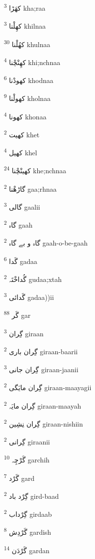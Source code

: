 \documentclass[12pt]{article}
\begin{document}
\begin{RTL}
\begin{multicols}{5}
{\ur کھَڑا}   \textsuperscript{3} kha;raa

{\ur کھِلْنا}   \textsuperscript{3} khilnaa

{\ur کھُلْنا}   \textsuperscript{30} khulnaa

{\ur کھِنْچْنا}   \textsuperscript{4} khi;nchnaa

{\ur کھودْنا}   \textsuperscript{6} khodnaa

{\ur کھولْنا}   \textsuperscript{9} kholnaa

{\ur کھونا}   \textsuperscript{4} khonaa

{\ur کھیت}   \textsuperscript{2} khet

{\ur کھیل}   \textsuperscript{4} khel

{\ur کھینْچْنا}   \textsuperscript{24} khe;nchnaa

{\ur گاڑھْنا}   \textsuperscript{2} gaa;rhnaa

{\ur گالی}   \textsuperscript{3} gaalii

{\ur گاہ}   \textsuperscript{2} gaah

{\ur گاہ و بے گاہ}   \textsuperscript{2} gaah-o-be-gaah

{\ur گَدا}   \textsuperscript{6} gadaa

{\ur گُداخْتَہ}   \textsuperscript{2} gudaa;xtah

{\ur گَدائی}   \textsuperscript{3} gadaa))ii

{\ur گَر}   \textsuperscript{88} gar

{\ur گِران}   \textsuperscript{3} giraan

{\ur گِران باری}   \textsuperscript{2} giraan-baarii

{\ur گِران جانی}   \textsuperscript{3} giraan-jaanii

{\ur گِران مایَگی}   \textsuperscript{2} giraan-maayagii

{\ur گِران مایَہ}   \textsuperscript{2} giraan-maayah

{\ur گِران نِشِین}   \textsuperscript{2} giraan-nishiin

{\ur گِرانی}   \textsuperscript{2} giraanii

{\ur گَرْچِہ}   \textsuperscript{10} garchih

{\ur گَرْد}   \textsuperscript{7} gard

{\ur گِرْد باد}   \textsuperscript{2} gird-baad

{\ur گِرْداب}   \textsuperscript{2} girdaab

{\ur گَرْدِش}   \textsuperscript{8} gardish

{\ur گَرْدَن}   \textsuperscript{14} gardan


\end{multicols}
\end{RTL}
\end{document}
